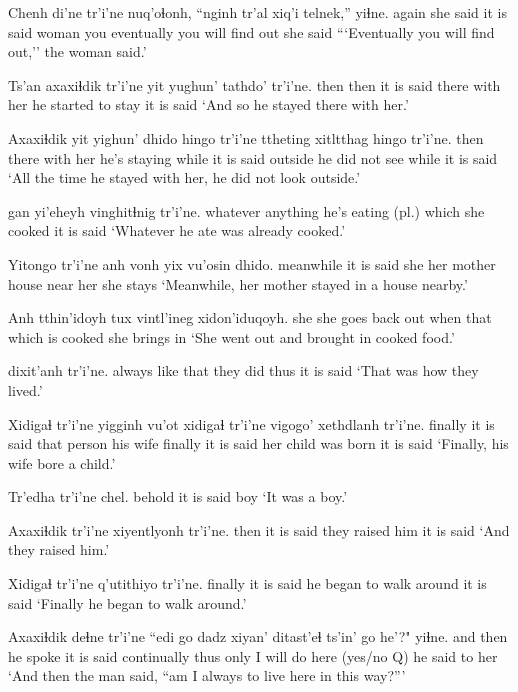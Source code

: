 \documentclass[12pt]{article}
\begin{document}
\gll Chenh di'ne tr'i'ne nuq'oɬonh, ``nginh  tr'al  {xiq'i telnek,}'' yiɬne.
again {she said} {it is said} woman you eventually {you will find out} {she said}
\glt ```Eventually you will find out,'' the woman said.'
\glend

\gll Ts'an axaxiɬdik tr'i'ne yit yughun' tathdo' tr'i'ne.
then then  {it is said} there {with her} {he started to stay} {it is said}
\glt `And so he stayed there with her.' 
\glend

\gll Axaxiɬdik yit  yighun' dhido  hingo tr'i'ne ttheting xitltthag hingo tr'i'ne.
then  there  {with her} {he's staying} while {it is said} outside {he did not see} while {it is said}
\glt `All the time he stayed with her, he did not look outside.'
\glend

 gan  yi'eheyh vinghitɬnig  tr'i'ne.
whatever  anything {he's eating (pl.)} {which she cooked} {it is said}
\glt `Whatever he ate was already cooked.'
\glend

\gll Yitongo tr'i'ne anh vonh  yix vu'osin dhido.
meanwhile {it is said} she {her mother} house {near her} {she stays}
\glt `Meanwhile, her mother stayed in a house nearby.'
\glend

\gll Anh tthin'idoyh tux  vintl'ineg  xidon'iduqoyh.
she {she goes back out} when  {that which is cooked} {she brings in}
\glt `She went out and brought in cooked food.'
\glend

 dixit'anh tr'i'ne.
{always like that} {they did thus} {it is said}
\glt `That was how they lived.'
\glend

\gll Xidigaɬ tr'i'ne yigginh vu'ot  xidigaɬ tr'i'ne vigogo' xethdlanh tr'i'ne.
finally  {it is said} {that person} {his wife} finally  {it is said} {her child} {was born} {it is said}
\glt `Finally, his wife bore a child.'
\glend

\gll Tr'edha tr'i'ne chel.
behold  {it is said} boy
\glt `It was a boy.'
\glend

\gll Axaxiɬdik tr'i'ne xiyentlyonh tr'i'ne.
then  {it is said} {they raised him} {it is said}
\glt `And they raised him.'
\glend

\gll Xidigaɬ tr'i'ne q'utithiyo   tr'i'ne.
finally  {it is said} {he began to walk around} {it is said}
\glt `Finally he began to walk around.'
\glend

\gll Axaxiɬdik deɬne  tr'i'ne ``edi {go dadz} xiyan' ditast'eɬ ts'in' go he'?" yiɬne.
{and then} {he spoke} {it is said} continually thus only {I will do} {} here {(yes/no Q)}  {he said to her}
\glt `And then the man said, ``am I always to live here in this way?'''
\glend
\end{document}
